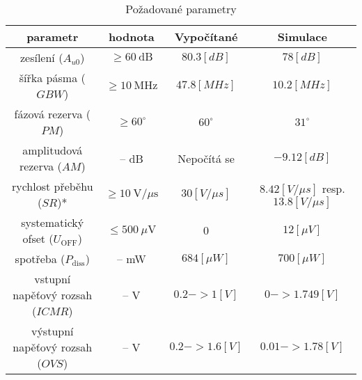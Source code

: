 \begin{table}[h]
    \centering
    \caption{Požadované parametry}
    \begin{tabular}{|c|c|c|c|} \hline
        \textbf{parametr}                       & \textbf{hodnota}                      & \textbf{Vypočítané} & \textbf{Simulace}                               \\ \hline
        zesílení ($A_{u0}$)                     & $\geq 60\ \mathrm{dB}$                & \(80.3 [dB]\)       & \(78 [dB]\)                                     \\ \hline
        šířka pásma ($GBW$)                     & $\geq 10\ \mathrm{MHz}$               & \(47.8 [MHz]\)      & \(10.2 [MHz]\)                                  \\ \hline
        fázová rezerva ($PM$)                   & $\geq 60^\circ$                       & $60^\circ$          & \(31^\circ\)                                    \\ \hline
        amplitudová rezerva ($AM$)              & -- dB                                 & Nepočítá se         & \(-9.12 [dB]\)                                  \\ \hline
        rychlost přeběhu ($SR$)*                & $\geq 10\ \mathrm{V}/\mu\mathrm{s}$   & \(30 [V/\mu s]\)    & \(8.42 [V/\mu s]\) resp.  \(13.8 [V/\mu s]\)    \\ \hline
        systematický ofset ($U_{\mathrm{OFF}}$) & $\leq 500\ \mu\mathrm{V}$             & $0$                 & \(12 [\mu V]\)                                  \\ \hline
        spotřeba ($P_{\mathrm{diss}}$)          & -- mW                                 & \(684 [\mu W]\)     & \(700 [\mu W]\)                                 \\ \hline
        vstupní napěťový rozsah ($ICMR$)        & -- V                                  & \(0.2 -> 1 [V]\)    & \(0 -> 1.749 [V]\)                              \\ \hline
        výstupní napěťový rozsah ($OVS$)        & -- V                                  & \(0.2 -> 1.6 [V]\)  & \(0.01 -> 1.78 [V]\)                            \\ \hline
    \end{tabular} 
    \\\vspace{1mm}
\end{table}